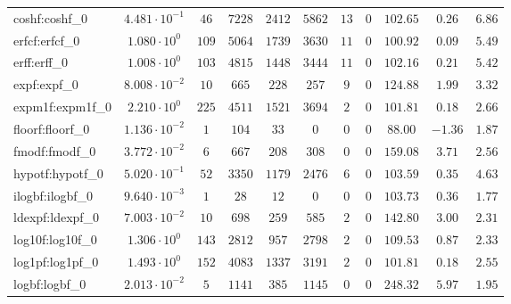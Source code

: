 \begin{tabular}{|l|c|c|c|c|c|c|c|c|c|c|}
coshf:coshf\_0               & $ 4.481 \cdot 10^{-1} $ & $ 46     $ & $ 7228   $ & $ 2412  $ & $ 5862  $ & $ 13  $ & $ 0 $ & $ 102.65      $ & $ 0.26    $ & $ 6.86    $ \\
erfcf:erfcf\_0               & $ 1.080 \cdot 10^{0}  $ & $ 109    $ & $ 5064   $ & $ 1739  $ & $ 3630  $ & $ 11  $ & $ 0 $ & $ 100.92      $ & $ 0.09    $ & $ 5.49    $ \\
erff:erff\_0                 & $ 1.008 \cdot 10^{0}  $ & $ 103    $ & $ 4815   $ & $ 1448  $ & $ 3444  $ & $ 11  $ & $ 0 $ & $ 102.16      $ & $ 0.21    $ & $ 5.42    $ \\
expf:expf\_0                 & $ 8.008 \cdot 10^{-2} $ & $ 10     $ & $ 665    $ & $ 228   $ & $ 257   $ & $ 9   $ & $ 0 $ & $ 124.88      $ & $ 1.99    $ & $ 3.32    $ \\
expm1f:expm1f\_0             & $ 2.210 \cdot 10^{0}  $ & $ 225    $ & $ 4511   $ & $ 1521  $ & $ 3694  $ & $ 2   $ & $ 0 $ & $ 101.81      $ & $ 0.18    $ & $ 2.66    $ \\
floorf:floorf\_0             & $ 1.136 \cdot 10^{-2} $ & $ 1      $ & $ 104    $ & $ 33    $ & $ 0     $ & $ 0   $ & $ 0 $ & $ 88.00       $ & $ -1.36   $ & $ 1.87    $ \\
fmodf:fmodf\_0               & $ 3.772 \cdot 10^{-2} $ & $ 6      $ & $ 667    $ & $ 208   $ & $ 308   $ & $ 0   $ & $ 0 $ & $ 159.08      $ & $ 3.71    $ & $ 2.56    $ \\
hypotf:hypotf\_0             & $ 5.020 \cdot 10^{-1} $ & $ 52     $ & $ 3350   $ & $ 1179  $ & $ 2476  $ & $ 6   $ & $ 0 $ & $ 103.59      $ & $ 0.35    $ & $ 4.63    $ \\
ilogbf:ilogbf\_0             & $ 9.640 \cdot 10^{-3} $ & $ 1      $ & $ 28     $ & $ 12    $ & $ 0     $ & $ 0   $ & $ 0 $ & $ 103.73      $ & $ 0.36    $ & $ 1.77    $ \\
ldexpf:ldexpf\_0             & $ 7.003 \cdot 10^{-2} $ & $ 10     $ & $ 698    $ & $ 259   $ & $ 585   $ & $ 2   $ & $ 0 $ & $ 142.80      $ & $ 3.00    $ & $ 2.31    $ \\
log10f:log10f\_0             & $ 1.306 \cdot 10^{0}  $ & $ 143    $ & $ 2812   $ & $ 957   $ & $ 2798  $ & $ 2   $ & $ 0 $ & $ 109.53      $ & $ 0.87    $ & $ 2.33    $ \\
log1pf:log1pf\_0             & $ 1.493 \cdot 10^{0}  $ & $ 152    $ & $ 4083   $ & $ 1337  $ & $ 3191  $ & $ 2   $ & $ 0 $ & $ 101.81      $ & $ 0.18    $ & $ 2.55    $ \\
logbf:logbf\_0               & $ 2.013 \cdot 10^{-2} $ & $ 5      $ & $ 1141   $ & $ 385   $ & $ 1145  $ & $ 0   $ & $ 0 $ & $ 248.32      $ & $ 5.97    $ & $ 1.95    $ \\

\end{tabular}
